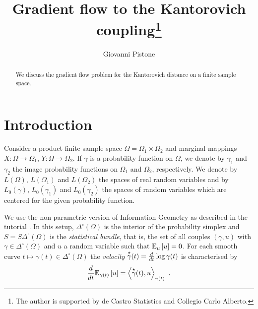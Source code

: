 \documentclass[runningheads]{llncs}
\begin{document}
%
\title{Gradient flow to the Kantorovich coupling\thanks{The author is
    supported by de Castro Statistics and Collegio Carlo Alberto.}}
%
%
\author{Giovanni Pistone}
%
%
%
\maketitle              %
%
\begin{abstract}
We discuss the gradient flow problem for the Kantorovich distance on a
finite sample space.
\end{abstract}
%
%
%
\section{Introduction}
Consider a product finite sample space
$\Omega=\Omega_1 \times \Omega_2$ and marginal mappings
$X \colon \Omega \to \Omega_1$, $Y \colon \Omega \to \Omega_2$. If
$\gamma$ is a probability function on $\Omega$, we denote by
$\gamma_1$ and $\gamma_2$ the image probability functions on
$\Omega_1$ and $\Omega_2$, respectively. We denote by $L(\Omega)$,
$L(\Omega_1)$ and $L(\Omega_2)$ the spaces of real random variables
and by $L_0(\gamma)$, $L_0(\gamma_1)$ and $L_0(\gamma_2)$ the spaces
of random variables which are centered for the given probability
function.

We use the non-parametric version of Information Geometry as described
in the tutorial \cite{pistone:2020-NPCS}. In this setup,
$\Delta^\circ(\Omega)$ is the interior of the probability simplex and
$S = S\Delta^\circ(\Omega)$ is the \emph{statistical bundle}, that is, the
set of all couples $(\gamma,u)$ with $\gamma \in \Delta^\circ(\Omega)$
and $u$ a random variable such that ${\operatorname{\mathbb E}}_{\mu}\left[u\right]=0$. For each
smooth curve $t \mapsto \gamma(t) \in \Delta^\circ(\Omega)$ the
\emph{velocity} $\overset{\star}{\gamma}(t) = \frac{d}{dt} \log \gamma(t)$ is
characterised by
\begin{equation}
  \label{eq:1}
  \derivby t \expectat {\gamma(t)} u = \scalarat {\gamma(t)} {\velocity
  \gamma(t)} u \ .
\end{equation}
\end{document}
